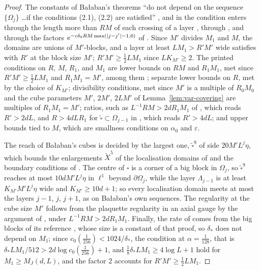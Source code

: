 \documentclass[11pt]{preprint}
\DeclarePairedDelimiter{\abs}{\lvert}{\rvert}
\numberwithin{equation}{section}
\theoremstyle{definition}
\theoremstyle{remark}
\theoremstyle{plain}
\begin{document}
\begin{proof}
The constants of Ba{\l}aban's theorems ``do not depend on the sequence $\{\Omega_j\}$ \ldots if the conditions (2.1), (2.2) are satisfied'' \cite[p.~399, l.~2]{BalabanPBG}, and in \cite{BalabanPRT2} the condition \cite[(2.2)]{BalabanPRT2} enters through the length more than $RM$ of each crossing of a layer \cite[(2.57), p.~233]{BalabanPRT2}, through \cite[Lemma~2.1, p.~234]{BalabanPRT2}, and through the factors $e^{-c\delta_0RM\max(\abs{j-j'}-1,0)}$ of \cite[pp.~235, 237]{BalabanPRT2}. Since $M'$ divides $M_1$ and $M$, the domains are unions of $M'$-blocks, and a layer at least $LM_1 > R'M'$ wide satisfies \cite[(2.2)]{BalabanPRT2} with $R'$ at the block size $M'$; ${R'M'} \geq \frac12LM_1$ since $LK_{M'} \geq 2$. The printed conditions on $R$, $M$, $R_1$, and $M_1$ are lower bounds on $RM$ and $R_1M_1$, met since $R'M' \geq \frac12LM_1$ and $R_1M_1 = M'$, among them \cite[(163), p.~304]{BalabanVAR}; separate lower bounds on $R$, met by the choice of $K_{M'}$; divisibility conditions, met since $M'$ is a multiple of $R_0M_0$ and the cube parameters $M'$, $2M'$, $2LM'$ of Lemma~\ref{lem:var-covering} are multiples of $R_1M_1 = M'$; ratios, such as $L^{-1}RM > 2dR_1M_1$ of \cite[p.~98, l.~18]{BalabanREG}, which reads $R' > 2dL$, and $R > 4dLR_1$ for $\tilde\square \subset \Omega_{j-1}$ in \cite[p.~300, l.~36]{BalabanVAR}, which reads $R' > 4dL$; and upper bounds tied to $M$, which are smallness conditions on $\alpha_0$ and $\varepsilon$.

The reach of Ba{\l}aban's cubes is decided by the largest one, $\tilde\square^9$ of side $20M'L^j\eta$, which bounds the enlargements $\tilde X^5$ of the localisation domains of \cite[Theorems~3.9--3.10]{BalabanPBG} \cite[p.~413, ll.~19--20; p.~416, ll.~7--8]{BalabanPBG} and the boundary conditions of \cite[p.~415, ll.~9--10]{BalabanPBG}. The centre of $\square$ is a corner of a big block in $\Omega_j$, so $\tilde\square^9$ reaches at most $10dM'L^j\eta$ in $\ell^1$ beyond $\partial\Omega_j$, while the layer $\Lambda_{j-1}$ is at least $K_{M'}M'L^j\eta$ wide and $K_{M'} \geq 10d + 1$; so every localisation domain meets at most the layers $j - 1$, $j$, $j + 1$, as on Ba{\l}aban's own sequences. The regularity \cite[(3.35)]{BalabanPBG} at the cube size $M'$ follows from the plaquette regularity in an axial gauge by the argument of \cite[p.~98]{BalabanREG}, under $L^{-1}RM > 2dR_1M_1$. Finally, the rate of \cite[(2.43)]{BalabanPRT2} comes from the big blocks of its reference \cite[p.~230, ll.~40--43]{BalabanPRT2}, whose size is a constant of that proof, so $\delta_*$ does not depend on $M_1$; since $c_0(\frac1{256}) < 1024/\delta_*$, the condition \cite[(2.59)]{BalabanPRT2} at $\alpha = \frac1{128}$, that is $\delta_*LM_1/512 > 2d\log c_0(\frac1{256}) + 1$, and $\frac18\delta_*LM_1 \geq 4\log L + 1$ hold for $M_1 \geq M_J(d, L)$, and the factor $2$ accounts for $R'M' \geq \frac12LM_1$.
\end{proof}
\end{document}
